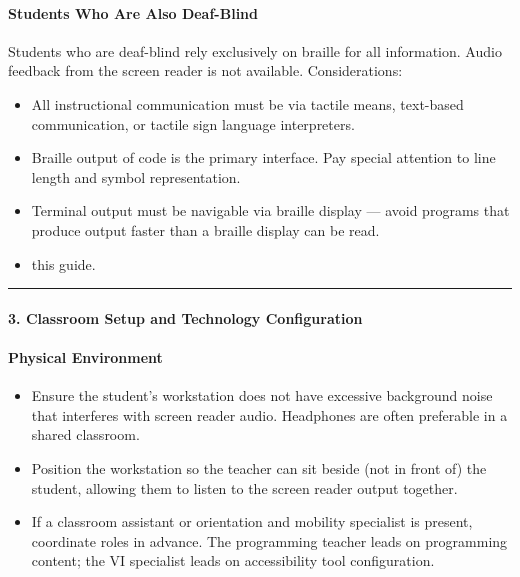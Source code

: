 \documentclass[
  justified,
  openright,
]{tufte-book}
\let\subsection\paragraph
\let\paragraph\paragraph
\let\subsection\paragraph
\let\paragraph\paragraph
\providecommand{\tightlist}{%
  \setlength{\itemsep}{0pt}\setlength{\parskip}{0pt}}
\begin{document}
\subsection{Students Who Are Also
Deaf-Blind}\label{students-who-are-also-deaf-blind}

Students who are deaf-blind rely exclusively on braille for all
information. Audio feedback from the screen reader is not available.
Considerations:

\begin{itemize}
\tightlist
\item
  All instructional communication must be via tactile means, text-based
  communication, or tactile sign language interpreters.
\item
  Braille output of code is the primary interface. Pay special attention
  to line length and symbol representation.
\item
  Terminal output must be navigable via braille display --- avoid
  programs that produce output faster than a braille display can be
  read.
\item
   this guide.
\end{itemize}

\begin{center}\rule{0.5\linewidth}{0.5pt}\end{center}

\subsection{3. Classroom Setup and Technology
Configuration}\label{classroom-setup-and-technology-configuration}

\subsection{Physical Environment}\label{physical-environment}

\begin{itemize}
\tightlist
\item
  Ensure the student's workstation does not have excessive background
  noise that interferes with screen reader audio. Headphones are often
  preferable in a shared classroom.
\item
  Position the workstation so the teacher can sit beside (not in front
  of) the student, allowing them to listen to the screen reader output
  together.
\item
  If a classroom assistant or orientation and mobility specialist is
  present, coordinate roles in advance. The programming teacher leads on
  programming content; the VI specialist leads on accessibility tool
  configuration.
\end{itemize}
\end{document}
